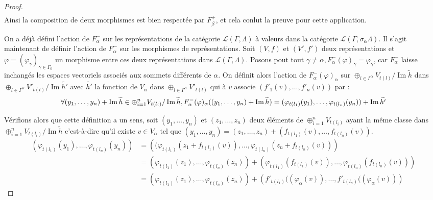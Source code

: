 \documentclass[a4paper,11pt]{article}
\DeclareMathOperator{\Img}{Im}
\begin{document}
\begin{proof}
\[\begin{array}{ll}
	\end{array}
\]
Ainsi la composition de deux morphismes est bien respectée par $F_{\beta}^{+}$, et cela conlut la preuve pour cette application.

On a déjà défini l'action de $F_{\alpha}^{-}$ sur les représentations de la catégorie $\mathscr L(\Gamma,\Lambda)$ à valeurs dans la catégorie $\mathscr L(\Gamma,\sigma_{\alpha}\Lambda)$. Il s'agit maintenant de définir l'action de $F_{\alpha}^{-}$ sur les morphismes de représentations. Soit $(V,f)$ et $(V',f')$ deux représentations et $\varphi = (\varphi_{\gamma})_{\gamma \in \Gamma_{0}}$ un morphisme entre ces deux représentations dans $\mathscr L(\Gamma,\Lambda)$. Posons pout tout $\gamma \neq \alpha, F_{\alpha}^{-}(\varphi)_{\gamma} = \varphi_{\gamma}$, car $F_{\alpha}^{-}$ laisse inchangés les espaces vectoriels associés aux sommets différents de $\alpha$. On définit alors l'action de  $F^{-}_{\alpha}(\varphi)_{\alpha}$ sur $\oplus_{l \in \Gamma^{\alpha}} V_{t(l)} / \Img \widetilde{h}$  dans $\oplus_{l \in \Gamma^{\alpha}} V'_{t(l)} / \Img \widetilde{h'}$ avec $\widetilde{h'}$ la fonction de $V_{\alpha}$ dans  $\oplus_{l \in \Gamma^{\alpha}} V'_{t(l)}$ qui à $v$ associe $(f'_{1}(v), \dots , f'_{n}(v))$ par : 
\[
\forall(y_{1}, \dots, y_{n})+ \Img \widetilde{h} \in  \oplus_{ i=1}^{n} V_{t(l_{i})} / \Img \widetilde{h}, \\ 
F_{\alpha}^{-}(\varphi)_{\alpha}((y_{1}, \dots, y_{n}) +\Img \widetilde{h}) = (\varphi_{t(l_{1})}(y_{1}), \dots , \varphi_{t(l_{n})}(y_{n})) + \Img \widetilde{h'}
\]

Vérifions alors que cette définition a un sens, soit $(y_{1}, \dots, y_{n})$ et $(z_{1}, \dots , z_{n})$ deux éléments de $\oplus_{i=1}^{n} V_{t(l_{i})}$ ayant la même classe dans $\oplus_{i=1}^{n} V_{t(l_{i})} / \Img \widetilde{h}$ c'est-à-dire qu'il existe $v \in V_{\alpha}$ tel que  $(y_{1}, \dots, y_{n}) = (z_{1}, \dots , z_{n}) + (f_{t(l_{1})}(v), \dots, f_{t(l_{n})}(v))$.
\[
\begin{array}{ll}
  \left(\varphi_{t(l_{1})}(y_{1}), \dots, \varphi_{t(l_{n})}(y_{n}) \right) &= \left((\varphi_{t(l_{1})}(z_{1} + f_{t(l_{1})}(v)), \dots, \varphi_{t(l_{n})}(z_{n} + f_{t(l_{n})}(v))\right) \\
  &= \left(\varphi_{t(l_{1})}(z_{1}), \dots, \varphi_{t(l_{n})}(z_{n})\right) + \left(\varphi_{t(l_{1})}(f_{t(l_{1})}(v)), \dots, \varphi_{t(l_{n})}(f_{t(l_{n})}(v)) \right)\\
&= \left(\varphi_{t(l_{1})}(z_{1}), \dots, \varphi_{t(l_{n})}(z_{n})\right) + \left(f'_{t(l_{1})}((\varphi_{\alpha}(v)), \dots, f'_{t(l_{n})}((\varphi_{\alpha}(v)) \right)
\end{array}
\]


\end{proof}
\end{document}
